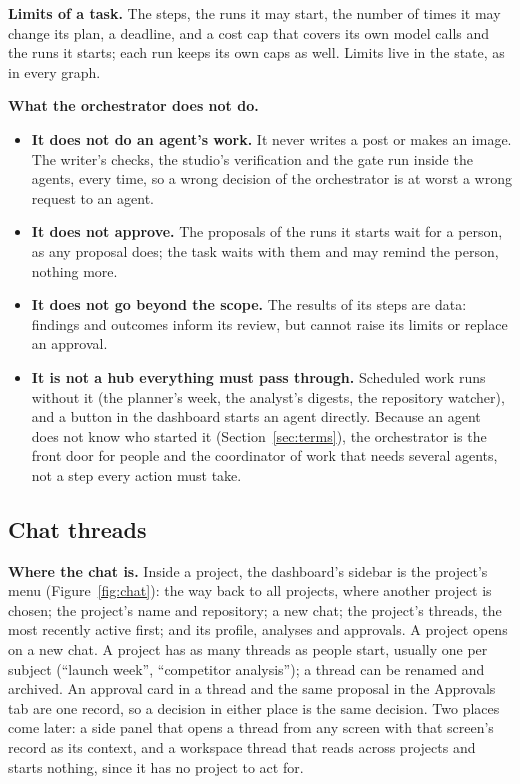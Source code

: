 \documentclass[11pt,a4paper]{article}
\begin{document}
\textbf{Limits of a task.} The steps, the runs it may start, the number of times it may change its plan, a deadline, and a cost cap that covers its own model calls and the runs it starts; each run keeps its own caps as well. Limits live in the state, as in every graph.

\textbf{What the orchestrator does not do.}
\begin{itemize}
  \item \textbf{It does not do an agent's work.} It never writes a post or makes an image. The writer's checks, the studio's verification and the gate run inside the agents, every time, so a wrong decision of the orchestrator is at worst a wrong request to an agent.
  \item \textbf{It does not approve.} The proposals of the runs it starts wait for a person, as any proposal does; the task waits with them and may remind the person, nothing more.
  \item \textbf{It does not go beyond the scope.} The results of its steps are data: findings and outcomes inform its review, but cannot raise its limits or replace an approval.
  \item \textbf{It is not a hub everything must pass through.} Scheduled work runs without it (the planner's week, the analyst's digests, the repository watcher), and a button in the dashboard starts an agent directly. Because an agent does not know who started it (Section~\ref{sec:terms}), the orchestrator is the front door for people and the coordinator of work that needs several agents, not a step every action must take.
\end{itemize}

\subsection{Chat threads}\label{sec:threads}
\textbf{Where the chat is.} Inside a project, the dashboard's sidebar is the project's menu (Figure~\ref{fig:chat}): the way back to all projects, where another project is chosen; the project's name and repository; a new chat; the project's threads, the most recently active first; and its profile, analyses and approvals. A project opens on a new chat. A project has as many threads as people start, usually one per subject (``launch week'', ``competitor analysis''); a thread can be renamed and archived. An approval card in a thread and the same proposal in the Approvals tab are one record, so a decision in either place is the same decision. Two places come later: a side panel that opens a thread from any screen with that screen's record as its context, and a workspace thread that reads across projects and starts nothing, since it has no project to act for.
\end{document}
